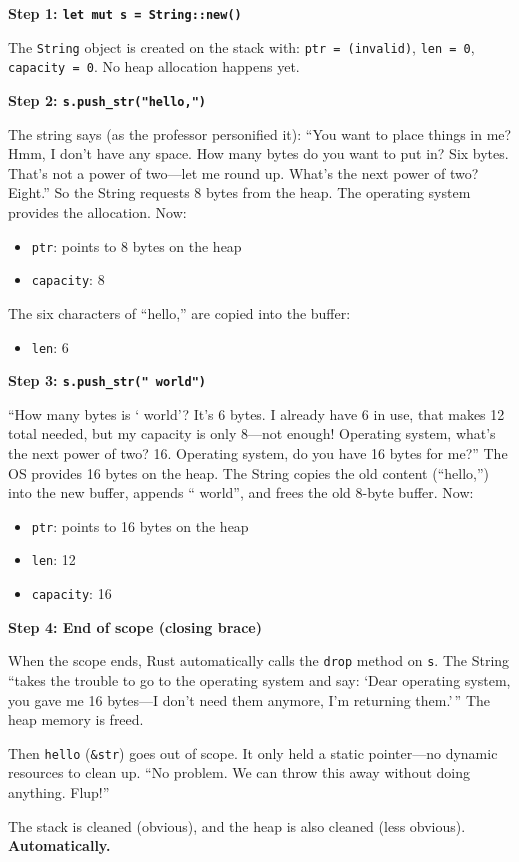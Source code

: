 \begin{memoryblock}
\textbf{Step 1: \texttt{let mut s = String::new()}}

The \texttt{String} object is created on the stack with: \texttt{ptr = (invalid)}, \texttt{len = 0}, \texttt{capacity = 0}. No heap allocation happens yet.

\textbf{Step 2: \texttt{s.push\_str("hello,")}}

The string says (as the professor personified it): ``You want to place things in me? Hmm, I don't have any space. How many bytes do you want to put in? Six bytes. That's not a power of two---let me round up. What's the next power of two? Eight.'' So the String requests 8 bytes from the heap. The operating system provides the allocation. Now:
\begin{itemize}
    \item \texttt{ptr}: points to 8 bytes on the heap
    \item \texttt{capacity}: 8
\end{itemize}
The six characters of ``hello,'' are copied into the buffer:
\begin{itemize}
    \item \texttt{len}: 6
\end{itemize}

\textbf{Step 3: \texttt{s.push\_str(" world")}}

``How many bytes is ` world'? It's 6 bytes. I already have 6 in use, that makes 12 total needed, but my capacity is only 8---not enough! Operating system, what's the next power of two? 16. Operating system, do you have 16 bytes for me?'' The OS provides 16 bytes on the heap. The String copies the old content (``hello,'') into the new buffer, appends `` world'', and frees the old 8-byte buffer. Now:
\begin{itemize}
    \item \texttt{ptr}: points to 16 bytes on the heap
    \item \texttt{len}: 12
    \item \texttt{capacity}: 16
\end{itemize}

\textbf{Step 4: End of scope (closing brace)}

When the scope ends, Rust automatically calls the \texttt{drop} method on \texttt{s}. The String ``takes the trouble to go to the operating system and say: `Dear operating system, you gave me 16 bytes---I don't need them anymore, I'm returning them.'\,'' The heap memory is freed.

Then \texttt{hello} (\texttt{\&str}) goes out of scope. It only held a static pointer---no dynamic resources to clean up. ``No problem. We can throw this away without doing anything. Flup!''

The stack is cleaned (obvious), and the heap is also cleaned (less obvious). \textbf{Automatically.}
\end{memoryblock}

